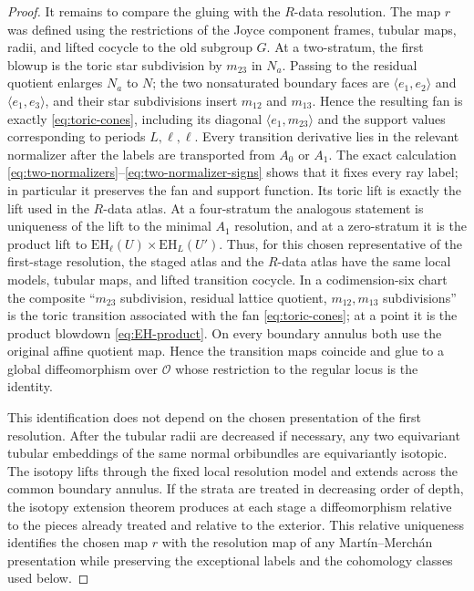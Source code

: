 \documentclass[11pt]{article}
\theoremstyle{remark}\newtheorem{remark}[theorem]{Remark}
\newcommand{\EH}{\mathrm{EH}}
\begin{document}
\begin{proof}
It remains to compare the gluing with the $R$-data resolution.  The map
$r$ was defined using the restrictions of the Joyce component frames,
tubular maps, radii, and lifted cocycle to the old subgroup $G$.  At a
two-stratum, the first blowup is the toric star subdivision by $m_{23}$ in
$N_a$.  Passing to the residual quotient enlarges $N_a$ to $N$; the two
nonsaturated boundary faces are $\langle e_1,e_2\rangle$ and
$\langle e_1,e_3\rangle$, and their star subdivisions insert $m_{12}$ and
$m_{13}$.  Hence the resulting fan is exactly \eqref{eq:toric-cones},
including its diagonal $\langle e_1,m_{23}\rangle$ and the support values
corresponding to periods $L,\ell,\ell$.  Every transition derivative lies in the relevant
normalizer after the labels are transported from $A_0$ or $A_1$.
The exact calculation \eqref{eq:two-normalizers}--\eqref{eq:two-normalizer-signs}
shows that it fixes every ray label; in particular it preserves the fan and
support function.  Its toric lift is exactly the lift used in the $R$-data
atlas.  At a four-stratum the
analogous statement is uniqueness of the lift to the minimal $A_1$
resolution, and at a zero-stratum it is the product lift to
$\EH_\ell(U)\times\EH_L(U')$.  Thus, for this chosen representative of the
first-stage resolution, the staged atlas and the $R$-data atlas have the
same local models, tubular maps, and lifted transition cocycle.  In a
codimension-six
chart the composite ``$m_{23}$ subdivision, residual lattice quotient,
$m_{12},m_{13}$ subdivisions'' is the toric transition associated with
the fan \eqref{eq:toric-cones}; at a point it is the product blowdown
\eqref{eq:EH-product}.  On every boundary annulus both use the original
affine quotient map.  Hence the transition maps coincide and glue to a
global diffeomorphism over $\mathcal O$ whose restriction to the regular
locus is the identity.

This identification does not depend on the chosen presentation of the
first resolution.  After the tubular radii are decreased if necessary,
any two equivariant tubular embeddings of the same normal orbibundles are
equivariantly isotopic.  The isotopy lifts through the fixed local
resolution model and extends across the common boundary annulus.  If the
strata are treated in decreasing order of depth, the isotopy extension
theorem produces at each stage a diffeomorphism relative to the pieces
already treated and relative to the exterior.  This relative uniqueness
identifies the chosen map $r$ with the resolution map of any
Mart\'in--Merch\'an presentation while preserving the exceptional labels
and the cohomology classes used below.
\end{proof}
\end{document}
